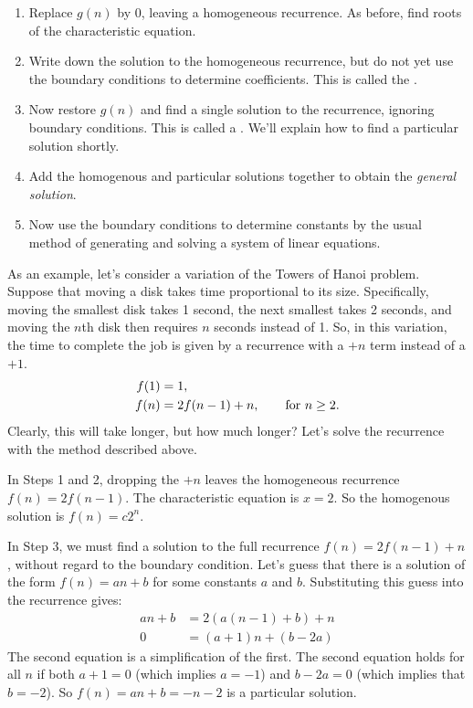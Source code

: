 \begin{enumerate}

\item Replace $g(n)$ by 0, leaving a homogeneous recurrence.  As
  before, find roots of the characteristic equation.

\item Write down the solution to the homogeneous recurrence, but do
  not yet use the boundary conditions to determine coefficients.  This
  is called the .

\item Now restore $g(n)$ and find a single solution to the recurrence,
  ignoring boundary conditions.  This is called a .  We'll explain how to find a particular solution
  shortly.

\item Add the homogenous and particular solutions together to obtain
  the \emph{general solution}.

\item Now use the boundary conditions to determine constants by the
  usual method of generating and solving a system of linear equations.

\end{enumerate}

As an example, let's consider a variation of the Towers of Hanoi
problem.  Suppose that moving a disk takes time proportional to its
size.  Specifically, moving the smallest disk takes 1 second, the
next smallest takes 2 seconds, and moving the $n$th disk then
requires $n$ seconds instead of 1.  So, in this variation, the time to
complete the job is given by a recurrence with a $+n$ term   instead of a $+1$.
\begin{align*}
f(1) & = 1, \\
f(n) & = 2 f(n - 1) + n, \text{\qquad for $n \geq 2$}.
\end{align*}
Clearly, this will take longer, but how much longer?  Let's solve the
recurrence with the method described above.

In Steps 1 and 2, dropping the $+n$ leaves the homogeneous recurrence
$f(n) = 2 f(n -1)$.  The characteristic equation is $x = 2$.  So the
homogenous solution is $f(n) = c2^n$.

In Step 3, we must find a solution to the full recurrence $f(n) = 2
f(n - 1) + n$, without regard to the boundary condition.  Let's guess
that there is a solution of the form $f(n) = a n + b$ for some
constants $a$ and $b$.  Substituting this guess into the recurrence
gives:
\begin{align*}
a n + b & = 2 (a (n - 1) + b) + n \\
0 & = (a + 1) n + (b - 2 a)
\end{align*}
The second equation is a simplification of the first.  The second
equation holds for all $n$ if both $a + 1 = 0$ (which implies $a =
-1$) and $b - 2a = 0$ (which implies that $b = -2$).  So $f(n) = an +
b = -n - 2$ is a particular solution.

